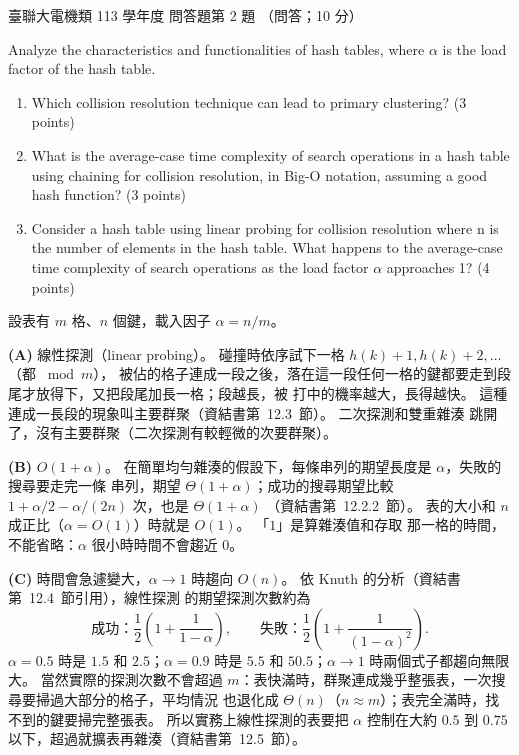 \begin{pastexam}[label={px:ust-113-ee-ds-18}]{臺聯大電機類 113 學年度 問答題第 2 題}
（問答；10 分）

Analyze the characteristics and functionalities of hash tables, where $\alpha$ is the load factor of
the hash table.
\begin{enumerate}[label=(\Alph*)]
\item Which collision resolution technique can lead to primary clustering? (3 points)
\item What is the average-case time complexity of search operations in a hash table using chaining
for collision resolution, in Big-O notation, assuming a good hash function? (3 points)
\item Consider a hash table using linear probing for collision resolution where n is the number of
elements in the hash table. What happens to the average-case time complexity of search operations
as the load factor $\alpha$ approaches 1? (4 points)
\end{enumerate}
\end{pastexam}

\begin{pastsoln}
設表有 $m$ 格、$n$ 個鍵，載入因子 $\alpha = n/m$。

\textbf{(A)} 線性探測（linear probing）。 碰撞時依序試下一格 $h(k) + 1, h(k) + 2, \ldots$（都 $\bmod m$），
被佔的格子連成一段之後，落在這一段任何一格的鍵都要走到段尾才放得下，又把段尾加長一格；段越長，被
打中的機率越大，長得越快。 這種連成一長段的現象叫主要群聚（資結書第~12.3~節）。 二次探測和雙重雜湊
跳開了，沒有主要群聚（二次探測有較輕微的次要群聚）。

\textbf{(B)} $O(1 + \alpha)$。 在簡單均勻雜湊的假設下，每條串列的期望長度是 $\alpha$，失敗的搜尋要走完一條
串列，期望 $\Theta(1 + \alpha)$；成功的搜尋期望比較 $1 + \alpha/2 - \alpha/(2n)$ 次，也是 $\Theta(1 + \alpha)$
（資結書第~12.2.2~節）。 表的大小和 $n$ 成正比（$\alpha = O(1)$）時就是 $O(1)$。 「$1$」是算雜湊值和存取
那一格的時間，不能省略：$\alpha$ 很小時時間不會趨近 $0$。

\textbf{(C)} 時間會急遽變大，$\alpha \to 1$ 時趨向 $O(n)$。 依 Knuth 的分析（資結書第~12.4~節引用），線性探測
的期望探測次數約為
\[
\text{成功：} \frac{1}{2}\left(1 + \frac{1}{1 - \alpha}\right), \qquad
\text{失敗：} \frac{1}{2}\left(1 + \frac{1}{(1 - \alpha)^2}\right).
\]
$\alpha = 0.5$ 時是 $1.5$ 和 $2.5$；$\alpha = 0.9$ 時是 $5.5$ 和 $50.5$；$\alpha \to 1$ 時兩個式子都趨向無限大。
當然實際的探測次數不會超過 $m$：表快滿時，群聚連成幾乎整張表，一次搜尋要掃過大部分的格子，平均情況
也退化成 $\Theta(n)$（$n \approx m$）；表完全滿時，找不到的鍵要掃完整張表。 所以實務上線性探測的表要把
$\alpha$ 控制在大約 $0.5$ 到 $0.75$ 以下，超過就擴表再雜湊（資結書第~12.5~節）。
\end{pastsoln}

